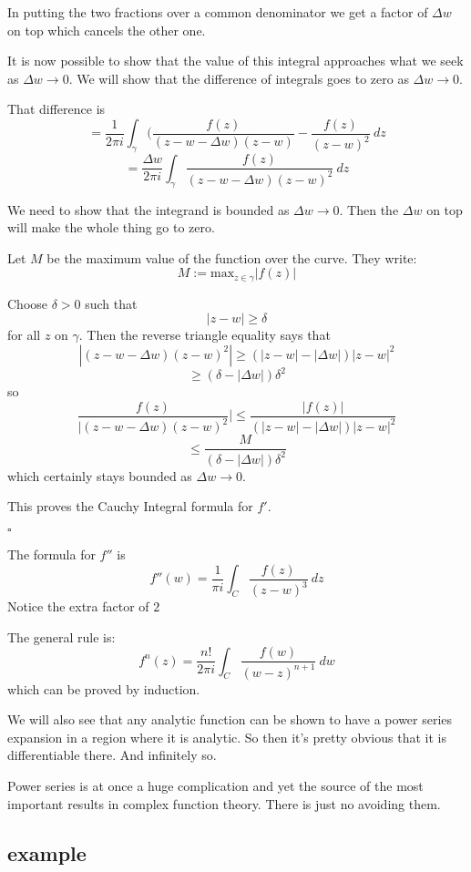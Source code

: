 \documentclass[11pt, oneside]{article}
\begin{document}
In putting the two fractions over a common denominator we get a factor of $\Delta w$ on top which cancels the other one.

It is now possible to show that the value of this integral approaches what we seek as $\Delta w \rightarrow 0$.  We will show that the difference of integrals goes to zero as $\Delta w \rightarrow 0$.

That difference is
\[ = \frac{1}{2 \pi i} \int_{\gamma} (\frac{f(z)}{(z - w - \Delta w)(z - w)} - \frac{f(z)}{(z - w)^2} \ dz \]
\[ = \frac{\Delta w}{2 \pi i} \int_\gamma \frac{f(z)}{(z - w - \Delta w)(z - w)^2} \ dz \]

We need to show that the integrand is bounded as $\Delta w \rightarrow 0$.  Then the $\Delta w$ on top will make the whole thing go to zero.

Let $M$ be the maximum value of the function over the curve.  They write:
\[ M := \text{max}_{z \in \gamma} |f(z)| \]

Choose $\delta > 0$ such that 
\[ |z - w| \ge \delta \]
for all $z$ on $\gamma$.  Then the reverse triangle equality says that
\[ |(z - w - \Delta w)(z - w)^2 | \ge ( |z - w| - |\Delta w|)|z - w|^2 \]
\[ \ge (\delta - |\Delta w|) \delta^2 \]
so
\[ \frac{f(z)}{|(z - w - \Delta w)(z - w)^2} | \le \frac{|f(z)|}{( |z - w| - |\Delta w|)|z - w|^2} \]
\[ \le \frac{M}{(\delta - |\Delta w|) \delta^2 } \]
which certainly stays bounded as $\Delta w \rightarrow 0$.

This proves the Cauchy Integral formula for $f'$.

$\square$

The formula for $f''$ is
\[ f''(w) = \frac{1}{\pi i} \int_C \frac{f(z)}{(z - w)^3} \ dz \]
Notice the extra factor of $2$

The general rule is:
\[ f^n(z) = \frac{n!}{2 \pi i} \int_C \frac{f(w)}{(w - z)^{n+1}} \ dw \]
which can be proved by induction.

We will also see that any analytic function can be shown to have a power series expansion in a region where it is analytic.  So then it's pretty obvious that it is differentiable there.  And infinitely so.

Power series is at once a huge complication and yet the source of the most important results in complex function theory.  There is just no avoiding them.

\subsection*{example}
\end{document}
